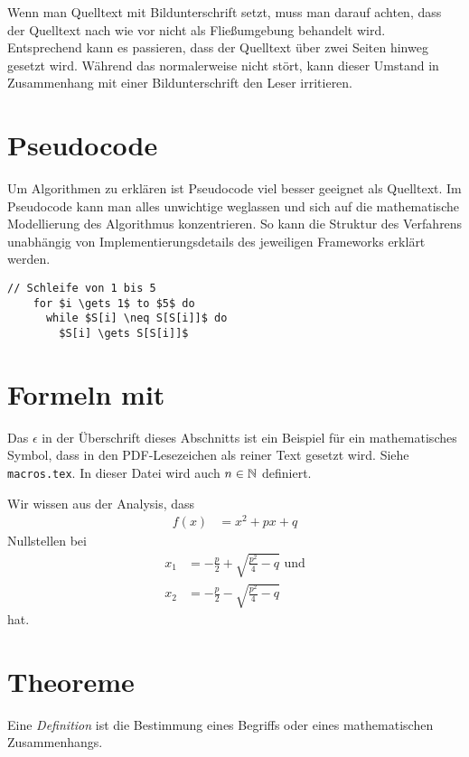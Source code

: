 Wenn man Quelltext mit Bildunterschrift setzt, muss man darauf achten, dass der Quelltext nach wie vor nicht als Fließumgebung behandelt wird. Entsprechend kann es passieren, dass der Quelltext über zwei Seiten hinweg gesetzt wird. Während das normalerweise nicht stört, kann dieser Umstand in Zusammenhang mit einer Bildunterschrift den Leser irritieren.

\section{Pseudocode}

Um Algorithmen zu erklären ist Pseudocode viel besser geeignet als Quelltext. Im Pseudocode kann man alles unwichtige weglassen und sich auf die mathematische Modellierung des Algorithmus konzentrieren. So kann die Struktur des Verfahrens unabhängig von Implementierungsdetails des jeweiligen Frameworks erklärt werden.

\begin{lstlisting}[style=pseudo,gobble=2]
  // Schleife von 1 bis 5
    for $i \gets 1$ to $5$ do
      while $S[i] \neq S[S[i]]$ do
        $S[i] \gets S[S[i]]$
\end{lstlisting}

\section{Formeln mit \pdfepsilon}

Das $\epsilon$ in der Überschrift dieses Abschnitts ist ein Beispiel für ein mathematisches Symbol, dass in den PDF-Lesezeichen als reiner Text gesetzt wird. Siehe \texttt{macros.tex}. In dieser Datei wird auch $n \in \mathbb{N}$ definiert.

Wir wissen aus der Analysis, dass
\begin{align}
  f(x) &= x^2 + px + q
\end{align}
Nullstellen bei
\begin{align}
  x_1 &= -\frac p2 + \sqrt{\frac{p^2}4 - q} \text{ und}\\
  x_2 &= -\frac p2 - \sqrt{\frac{p^2}4 - q}
\end{align}
hat.

\section{Theoreme}

\begin{Definition}[Definition]
  Eine \emph{Definition} ist die Bestimmung eines Begriffs oder eines mathematischen Zusammenhangs.
\end{Definition}

